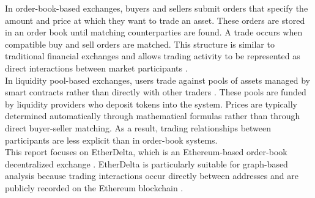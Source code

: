 \documentclass[language=english,thesis=bachelor,nosecondtitle,faculty=cb,onesided,13pt]{hsmw-thesis}
\begin{document}
In order-book-based exchanges, buyers and sellers submit orders that specify the amount and price at which they want to trade an asset. These orders are stored in an order book until matching counterparties are found. A trade occurs when compatible buy and sell orders are matched. This structure is similar to traditional financial exchanges and allows trading activity to be represented as direct interactions between market participants \cite{lin2019deconstructing}.\\
In liquidity pool-based exchanges, users trade against pools of assets managed by smart contracts rather than directly with other traders \cite{adams2020uniswap}. These pools are funded by liquidity providers who deposit tokens into the system. Prices are typically determined automatically through mathematical formulas rather than through direct buyer-seller matching. As a result, trading relationships between participants are less explicit than in order-book systems.\\
This report focuses on EtherDelta, which is an Ethereum-based order-book decentralized exchange \cite{victor2021detecting}. EtherDelta is particularly suitable for graph-based analysis because trading interactions occur directly between addresses and are publicly recorded on the Ethereum blockchain \cite{victor2021detecting}.
\end{document}
